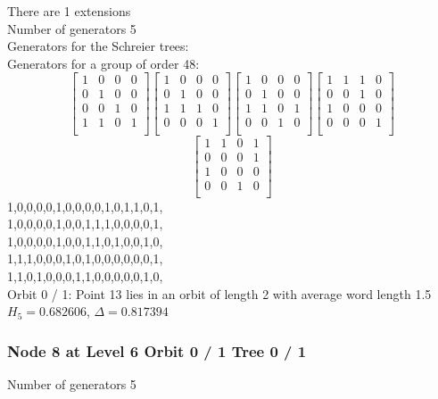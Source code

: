 There are 1 extensions\\
Number of generators 5\\
Generators for the Schreier trees:\\
{\small\arraycolsep=2pt
Generators for a group of order 48:
$$
\left[
\begin{array}{*{4}{r}}
1 & 0 & 0 & 0\\
0 & 1 & 0 & 0\\
0 & 0 & 1 & 0\\
1 & 1 & 0 & 1\\
\end{array}
\right]
\left[
\begin{array}{*{4}{r}}
1 & 0 & 0 & 0\\
0 & 1 & 0 & 0\\
1 & 1 & 1 & 0\\
0 & 0 & 0 & 1\\
\end{array}
\right]
\left[
\begin{array}{*{4}{r}}
1 & 0 & 0 & 0\\
0 & 1 & 0 & 0\\
1 & 1 & 0 & 1\\
0 & 0 & 1 & 0\\
\end{array}
\right]
\left[
\begin{array}{*{4}{r}}
1 & 1 & 1 & 0\\
0 & 0 & 1 & 0\\
1 & 0 & 0 & 0\\
0 & 0 & 0 & 1\\
\end{array}
\right]
$$
$$
\left[
\begin{array}{*{4}{r}}
1 & 1 & 0 & 1\\
0 & 0 & 0 & 1\\
1 & 0 & 0 & 0\\
0 & 0 & 1 & 0\\
\end{array}
\right]
$$
1,0,0,0,0,1,0,0,0,0,1,0,1,1,0,1,\\
1,0,0,0,0,1,0,0,1,1,1,0,0,0,0,1,\\
1,0,0,0,0,1,0,0,1,1,0,1,0,0,1,0,\\
1,1,1,0,0,0,1,0,1,0,0,0,0,0,0,1,\\
1,1,0,1,0,0,0,1,1,0,0,0,0,0,1,0,\\
}
\noindent Orbit 0 / 1: Point 13 lies in an orbit of length 2 with average word length 1.5 $H_{5} = 0.682606$, $\Delta = 0.817394$\\
\subsubsection*{Node 8 at Level 6 Orbit 0 / 1 Tree 0 / 1}
Number of generators 5\\

